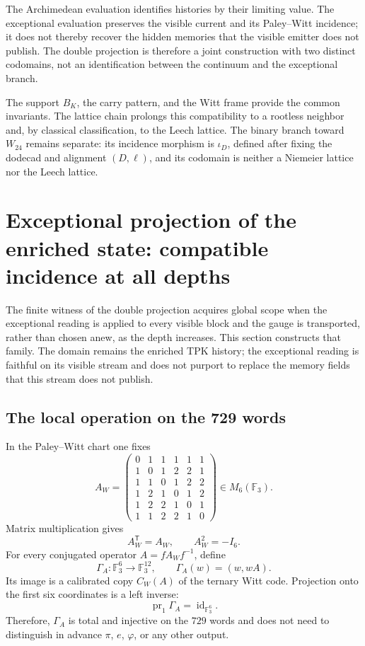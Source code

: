 The Archimedean evaluation identifies histories by their limiting value. The
exceptional evaluation preserves the visible current and its Paley--Witt
incidence; it does not thereby recover the hidden memories that the visible emitter
does not publish. The double projection is therefore a joint construction with
two distinct codomains, not an identification between the continuum and the
exceptional branch.

\begin{remark}
The support \(B_K\), the carry pattern, and the Witt frame provide the
common invariants. The lattice chain prolongs this compatibility to a
rootless neighbor and, by classical classification, to the Leech lattice. The
binary branch toward \(W_{24}\) remains separate: its incidence morphism is
\(\iota_D\), defined after fixing the dodecad and alignment
\((D,\ell)\), and its codomain is neither a Niemeier lattice nor the
Leech lattice.
\end{remark}


\section{Exceptional projection of the enriched state: compatible incidence at all depths}
\label{p12-83-c17-s2:chap:lector-excepcional-global-rev6}

The finite witness of the double projection acquires global scope when the
exceptional reading is applied to every visible block and the gauge is
transported, rather than chosen anew, as the depth increases. This
section constructs that family. The domain remains the enriched TPK
history; the exceptional reading is faithful on its visible stream and does not
purport to replace the memory fields that this stream does not publish.

\subsection{The local operation on the 729 words}

In the Paley--Witt chart one fixes
\[
A_W=
\begin{pmatrix}
0&1&1&1&1&1\\
1&0&1&2&2&1\\
1&1&0&1&2&2\\
1&2&1&0&1&2\\
1&2&2&1&0&1\\
1&1&2&2&1&0
\end{pmatrix}
\in M_6(\mathbb F_3).
\]
Matrix multiplication gives
\[
A_W^{\mathsf T}=A_W,\qquad A_W^2=-I_6.
\]
For every conjugated operator \(A=fA_Wf^{-1}\), define
\[
\Gamma_A:\mathbb F_3^6\longrightarrow\mathbb F_3^{12},
\qquad
\Gamma_A(w)=(w,wA).
\]
Its image is a calibrated copy \(C_W(A)\) of the ternary Witt code.
Projection onto the first six coordinates is a left inverse:
\[
\operatorname{pr}_1\Gamma_A=\operatorname{id}_{\mathbb F_3^6}.
\]
Therefore, \(\Gamma_A\) is total and injective on the \(729\) words and
does not need to distinguish in advance \(\pi\), \(e\), \(\varphi\), or any
other output.

